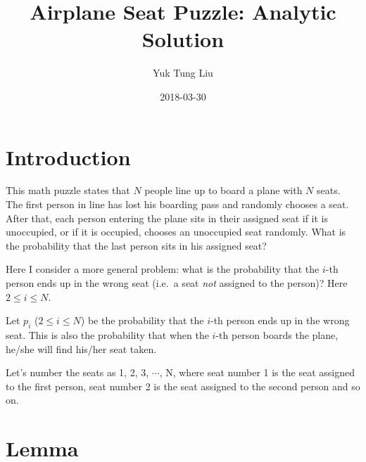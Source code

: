 \documentclass[11pt]{article}
\numberwithin{equation}{section}
\begin{document}
\title{Airplane Seat Puzzle: Analytic Solution}
\author{Yuk Tung Liu}
\date{2018-03-30}
\maketitle

\section{Introduction}

This math puzzle states that $N$ people line up to board 
a plane with $N$ seats. The first person in line has 
lost his boarding pass and randomly chooses a seat. 
After that, each person entering the plane sits in 
their assigned seat if it is unoccupied, or if it 
is occupied, chooses an unoccupied seat randomly. 
What is the probability that the last person sits 
in his assigned seat? 

Here I consider a more general problem: what is the 
probability that the $i$-th person ends up in the 
wrong seat (i.e.\ a seat {\it not} assigned to the person)? 
Here $2 \leq i \leq N$.

Let $p_i$ ($2 \leq i \leq N$) be the probability that the $i$-th person ends up in the
wrong seat. This is also the probability that when the $i$-th person 
boards the plane, he/she will find his/her seat taken. 

Let's number the seats as 1, 2, 3, $\cdots$, N, where 
seat number 1 is the seat assigned to the first person, seat number 2 
is the seat assigned to the second person and so on. 

\section{Lemma}
\end{document}
